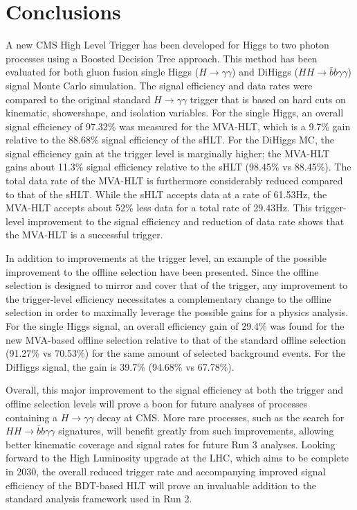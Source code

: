 \documentclass[12pt]{ucsddissertation}
\begin{document}
\chapter{Conclusions}
A new CMS High Level Trigger has been developed for Higgs to two photon processes using a Boosted Decision Tree approach. This method has been evaluated for both gluon fusion single Higgs ($H \rightarrow \gamma \gamma$) and DiHiggs ($HH \rightarrow \bar{b} b \gamma \gamma$) signal Monte Carlo simulation. The signal efficiency and data rates were compared to the original standard $H \rightarrow \gamma \gamma$ trigger that is based on hard cuts on kinematic, showershape, and isolation variables. For the single Higgs, an overall signal efficiency of 97.32\% was measured for the MVA-HLT, which is a 9.7\% gain relative to the 88.68\% signal efficiency of the sHLT. For the DiHiggs MC, the signal efficiency gain at the trigger level is marginally higher; the MVA-HLT gains about 11.3\% signal efficiency relative to the sHLT (98.45\% vs 88.45\%). The total data rate of the MVA-HLT is furthermore considerably reduced compared to that of the sHLT. While the sHLT accepts data at a rate of 61.53Hz, the MVA-HLT accepts about 52\% less data for a total rate of 29.43Hz. This trigger-level improvement to the signal efficiency and reduction of data rate shows that the MVA-HLT is a successful trigger.

In addition to improvements at the trigger level, an example of the possible improvement to the offline selection have been presented. Since the offline selection is designed to mirror and cover that of the trigger, any improvement to the trigger-level efficiency necessitates a complementary change to the offline selection in order to maximally leverage the possible gains for a physics analysis. For the single Higgs signal, an overall efficiency gain of 29.4\% was found for the new MVA-based offline selection relative to that of the standard offline selection (91.27\% vs 70.53\%) for the same amount of selected background events. For the DiHiggs signal, the gain is 39.7\% (94.68\% vs 67.78\%).

Overall, this major improvement to the signal efficiency at both the trigger and offline selection levels will prove a boon for future analyses of processes containing a $H \rightarrow \gamma \gamma$ decay at CMS. More rare processes, such as the search for $HH \rightarrow \bar{b} b \gamma \gamma$ signatures, will benefit greatly from such improvements, allowing better kinematic coverage and signal rates for future Run 3 analyses. Looking forward to the High Luminosity upgrade at the LHC, which aims to be complete in 2030, the overall reduced trigger rate and accompanying improved signal efficiency of the BDT-based HLT will prove an invaluable addition to the standard analysis framework used in Run 2.


\appendix

\backmatter
\printbibliography
\end{document}
